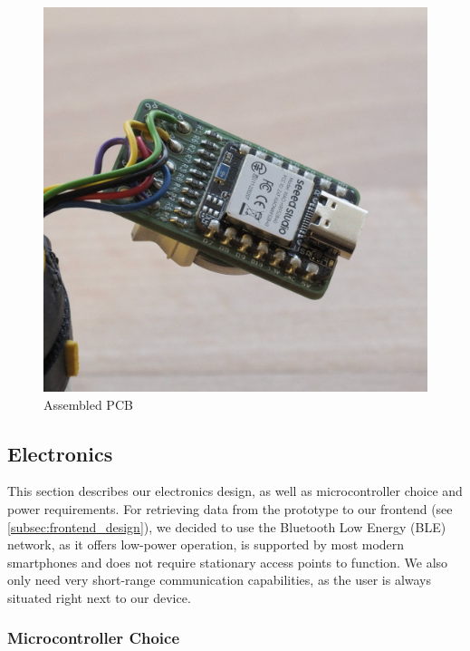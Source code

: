 \begin{figure}[!htb]
\begin{minipage}{.3333\textwidth}
        \caption{\rotatorhead}
        \label{fig:cad_rotator_head}
    \end{minipage}%
    \begin{minipage}{.3333\textwidth}
        \centering
        \includegraphics[width=.9\linewidth]{images/likertshift_pcb.jpg}
        \caption{Assembled PCB}
        \label{fig:likertshift_pcb}
    \end{minipage}
\end{figure}

\noindent

\subsection{Electronics}\label{subsec:electronics}

This section describes our electronics design, as well as microcontroller choice and power requirements.
For retrieving data from the prototype to our frontend (see \autoref{subsec:frontend_design}), we decided to use the Bluetooth Low Energy (BLE) network, as it offers low-power operation, is supported by most modern smartphones and does not require stationary access points to function.
We also only need very short-range communication capabilities, as the user is always situated right next to our device.

\subsubsection{Microcontroller Choice}

